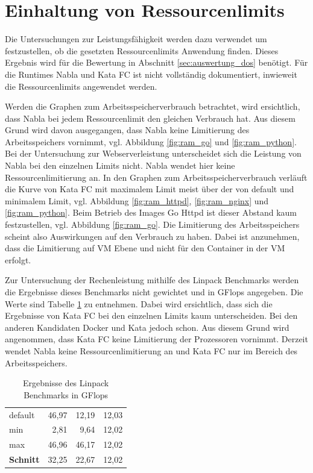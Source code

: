 \section{Einhaltung von Ressourcenlimits}
\label{sec:resslimits}
Die Untersuchungen zur Leistungsfähigkeit werden dazu verwendet um festzustellen, ob die gesetzten Ressourcenlimits Anwendung finden. Dieses Ergebnis wird für die Bewertung in Abschnitt \ref{sec:auswertung_dos} benötigt. Für die Runtimes Nabla und Kata FC ist nicht vollständig dokumentiert, inwieweit die Ressourcenlimits angewendet werden. 

Werden die Graphen zum Arbeitsspeicherverbrauch betrachtet, wird ersichtlich, dass Nabla bei jedem Ressourcenlimit den gleichen Verbrauch hat. Aus diesem Grund wird davon ausgegangen, dass Nabla keine Limitierung des Arbeitsspeichers vornimmt, vgl. Abbildung \ref{fig:ram_go} und \ref{fig:ram_python}. Bei der Untersuchung zur Webserverleistung unterscheidet sich die Leistung von Nabla bei den einzelnen Limits nicht. Nabla wendet hier keine Ressourcenlimitierung an.
In den Graphen zum Arbeitsspeicherverbrauch verläuft die Kurve von Kata FC mit maximalem Limit meist über der von default und minimalem Limit, vgl. Abbildung \ref{fig:ram_httpd}, \ref{fig:ram_nginx} und \ref{fig:ram_python}. Beim Betrieb des Images Go Httpd ist dieser Abstand kaum festzustellen, vgl. Abbildung \ref{fig:ram_go}. Die Limitierung des Arbeitsspeichers scheint also Auswirkungen auf den Verbrauch zu haben. Dabei ist anzunehmen, dass die Limitierung auf \ac{VM} Ebene und nicht für den Container in der \ac{VM} erfolgt. 

Zur Untersuchung der Rechenleistung mithilfe des Linpack Benchmarks werden die Ergebnisse dieses Benchmarks nicht gewichtet und in GFlops angegeben. Die Werte sind Tabelle \ref{tbl:linpackergebnisingflops} zu entnehmen. Dabei wird ersichtlich, dass sich die Ergebnisse von Kata FC bei den einzelnen Limits kaum unterscheiden. Bei den anderen Kandidaten Docker und Kata jedoch schon. Aus diesem Grund wird angenommen, dass Kata FC keine Limitierung der Prozessoren vornimmt.
Derzeit wendet Nabla keine Ressourcenlimitierung an und Kata FC nur im Bereich des Arbeitsspeichers.

\begin{table}[h]
	\myfloatalign
	\small 
	\begin{tabularx}{\textwidth}{Xrrr} \hline
		\spacedlowsmallcaps{Limit} & \spacedlowsmallcaps{Docker} & \spacedlowsmallcaps{Kata} & \spacedlowsmallcaps{Kata FC} \\ \hline
		default & 46,97 & 12,19 & 12,03 \\
		min & 2,81 & 9,64 & 12,02 \\
		max & 46,96 & 46,17 & 12,02 \\ \hline
		\textbf{Schnitt} & 32,25 & 22,67 & 12,02\\\hline
	\end{tabularx}
	\caption[Ergebnisse des Linpack Benchmarks in GFlops]{Ergebnisse des Linpack Benchmarks in GFlops}
	\label{tbl:linpackergebnisingflops}
\end{table}

